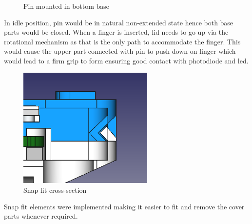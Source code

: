 		\begin{figure}[ht!]
			\centering
			\hfill
			\caption{Pin mounted in bottom base}
		\end{figure}	
		
		In idle position, pin would be in natural non-extended state hence both base parts would be closed. When a finger is inserted, lid needs to go up via the rotational mechanism as that is the only path to accommodate the finger. This would cause the upper part connected with pin to push down on finger which would lead to a firm grip to form ensuring good contact with photodiode and led.

		\begin{figure}[ht!]
			\centering
			\includegraphics[width=0.6\textwidth]{../common/enc/snap.png}
			\caption{Snap fit cross-section}
		\end{figure}	
		
	
		Snap fit elements were implemented making it easier to fit and remove the cover parts whenever required.
